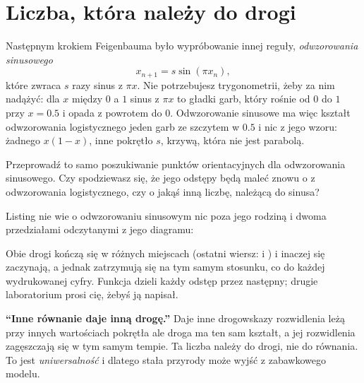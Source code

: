 \section{Liczba, która należy do drogi}
\label{sec:ch08-universal}

\noindent
Następnym krokiem Feigenbauma było wypróbowanie innej reguły,
\emph{odwzorowania sinusowego}
\[ x_{n+1} = s \sin(\pi x_{n}), \]
które zwraca $s$ razy sinus z $\pi x$. Nie potrzebujesz trygonometrii, żeby
za nim nadążyć: dla $x$ między $0$ a $1$ sinus z $\pi x$ to gładki garb,
który rośnie od $0$ do $1$ przy $x = \num{0.5}$ i opada z powrotem do $0$.
Odwzorowanie sinusowe ma więc kształt odwzorowania logistycznego \dash{}
jeden garb ze szczytem w $\num{0.5}$ \dash{} i nic z jego wzoru: żadnego
$x(1 - x)$, inne pokrętło $s$, krzywą, która nie jest parabolą.

\begin{think}
Przeprowadź to samo poszukiwanie punktów orientacyjnych dla odwzorowania
sinusowego. Czy spodziewasz się, że jego odstępy będą maleć znowu o
 z odwzorowania logistycznego, czy o jakąś inną liczbę,
należącą do sinusa?
\end{think}

\noindent
Listing nie wie o odwzorowaniu sinusowym nic poza jego rodziną i dwoma
przedziałami odczytanymi z jego diagramu:



\noindent
Obie drogi kończą się w różnych miejscach (ostatni wiersz:  i
) i inaczej się zaczynają, a jednak zatrzymują się na tym
samym stosunku, co do każdej wydrukowanej cyfry. Funkcja  dzieli
każdy odstęp przez następny; drugie laboratorium prosi cię, żebyś ją
napisał.

\begin{trapbox}
\textbf{\enquote{Inne równanie daje inną drogę.}} Daje inne drogowskazy
\dash{} rozwidlenia leżą przy innych wartościach pokrętła \dash{} ale droga
ma ten sam kształt, a jej rozwidlenia zagęszczają się w tym samym tempie. Ta
liczba należy do drogi, nie do równania. To jest \emph{uniwersalność} i
dlatego stała przyrody może wyjść z zabawkowego modelu.
\end{trapbox}

